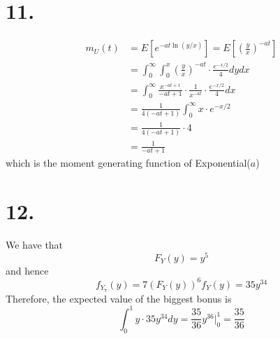 \documentclass[11pt]{article}
\begin{document}
\section*{11.}
\begin{equation*}
    \begin{aligned}
        m_U(t) &= E[e^{-at\ln(y/x)}] = E\left[\left(\frac{y}{x}\right)^{-at}\right] \\
        &= \int_0^\infty \int_0^x \left(\frac{y}{x}\right)^{-at} \cdot \frac{e^{-x/2}}{4} dydx \\
        &= \int_0^\infty \frac{x^{-at+1}}{-at+1} \cdot \frac{1}{x^{-at}} \cdot \frac{e^{-x/2}}{4} dx \\
        &= \frac{1}{4(-at+1)}\int_0^\infty x \cdot e^{-x/2} \\
        &= \frac{1}{4(-at+1)} \cdot 4 \\
        &= \frac{1}{-at+1}
    \end{aligned}
\end{equation*} 
which is the moment generating function of Exponential($a$)
\pagebreak
\section*{12.}
We have that
\[
    F_Y(y) = y^5    
\]
and hence
\[
    f_{Y_7}(y) = 7(F_Y(y))^6 f_Y(y) = 35y^{34}
\]
Therefore, the expected value of the biggest bonus is 
\[
    \int_0^1 y \cdot 35y^{34} dy = \frac{35}{36}y^{36} |^1_0 = \frac{35}{36}  
\]
\pagebreak
\end{document}
